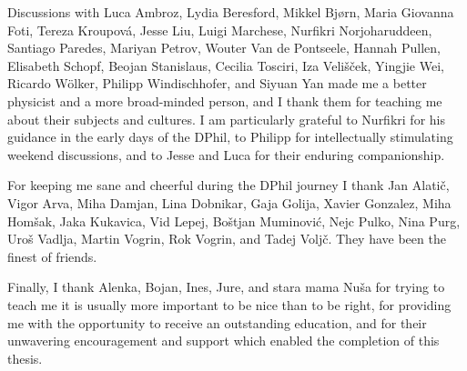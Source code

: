 \begin{acknowledgements}
Discussions with Luca Ambroz, Lydia Beresford, Mikkel Bj{\o}rn, Maria Giovanna
Foti, Tereza Kroupov\'a, Jesse Liu, Luigi Marchese, Nurfikri Norjoharuddeen,
Santiago Paredes, Mariyan Petrov, Wouter Van de Pontseele, Hannah Pullen,
Elisabeth Schopf, Beojan Stanislaus, Cecilia Tosciri, Iza Veli\v{s}\v{c}ek,
Yingjie Wei, Ricardo W\"olker, Philipp Windischhofer, and Siyuan Yan made me a
better physicist and a more broad-minded person, and I thank them for teaching
me about their subjects and cultures. I am particularly grateful to Nurfikri
for his guidance in the early days of the DPhil, to Philipp for intellectually
stimulating weekend discussions, and to Jesse and Luca for their enduring
companionship.

For keeping me sane and cheerful during the DPhil journey I thank Jan
Alati\v{c}, Vigor Arva, Miha Damjan, Lina Dobnikar, Gaja Golija, Xavier
Gonzalez, Miha Hom\v{s}ak, Jaka Kukavica, Vid Lepej, Bo\v{s}tjan Muminovi\'{c},
Nejc Pulko, Nina Purg, Uro\v{s} Vadlja, Martin Vogrin, Rok Vogrin, and Tadej
Volj\v{c}. They have been the finest of friends.

Finally, I thank Alenka, Bojan, Ines, Jure, and stara mama Nu\v{s}a for
trying to teach me it is usually more important to be nice than to be right,
for providing me with the opportunity to receive an outstanding education, and
for their unwavering encouragement and support which enabled the completion
of this thesis.

\end{acknowledgements}

